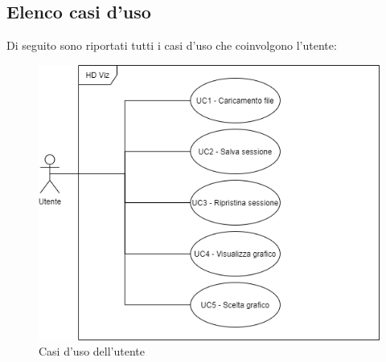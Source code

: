 \subsection{Elenco casi d'uso}
Di seguito sono riportati tutti i casi d'uso che coinvolgono l'utente:
\begin{figure}[h]
\includegraphics[width=\linewidth]{section/Images/HDviz.png}
\centering
\caption{Casi d'uso dell'utente}
\end{figure}











